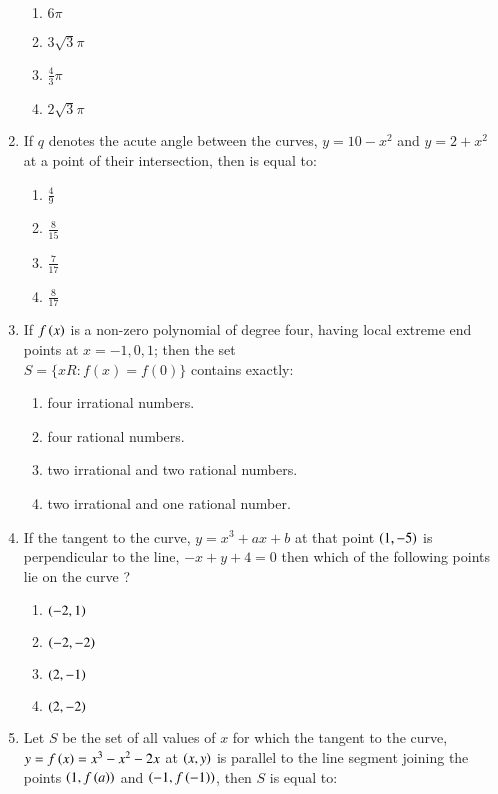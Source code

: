 \documentclass[article,12pt,onecolumn]{IEEEtran}
\theoremstyle{remark}
\begin{document}
\begin{enumerate}[start=40]
\hfill {}
\begin{multicols}{2}
\begin{enumerate}
    \item $6\pi$
    \item $3\sqrt{3}\pi$
    \item $\frac{4}{3}\pi$
    \item $2\sqrt{3}\pi$
\end{enumerate}
\end{multicols}
\item If $q$ denotes the acute angle between the curves,
$y=10-x^2$ and $y=2+x^2$ at a point of their intersection, then is equal to: 
\hfill {}
\begin{multicols}{2}
\begin{enumerate}
    \item $\frac{4}{9}$
    \item $\frac{8}{15}$
    \item $\frac{7}{17}$ 
    \item $\frac{8}{17}$
\end{enumerate}
\end{multicols}
\item If $f\left(x\right)$ is a non-zero polynomial of degree four, having local extreme end points at $ x=-1,0,1 $; then the set
\\ $S = \{x R:f(x)=f(0)\}$ contains exactly:
\hfill {}
\begin{enumerate}
    \item four irrational numbers.
    \item four rational numbers.
    \item two irrational and two rational numbers. 
    \item two irrational and one rational number.
\end{enumerate}
\item If the tangent to the curve, $y=x^{3}+ax+b$ at that point $\left(1,-5\right)$ is perpendicular to the line, $-x+y+4=0$ then which of the following points lie on the curve ?
\hfill {}
\begin{multicols}{2}
\begin{enumerate}
    \item $\left(-2,1\right)$
    \item $\left(-2,-2\right)$
    \item $\left(2,-1\right)$ 
    \item $\left(2,-2 \right)$
\end{enumerate}
\end{multicols}
\item Let $S$ be the set of all values of $x$ for which the tangent to the curve, $y=f\left(x\right)=x^{3}-x^{2}-2x$ at $\left(x,y\right)$ is parallel to the line segment joining the points $\left(1,f\left(a\right)\right)$ and $\left(-1,f\left(-1\right)\right)$, then $S$ is equal to:


\end{enumerate}
\end{document}
